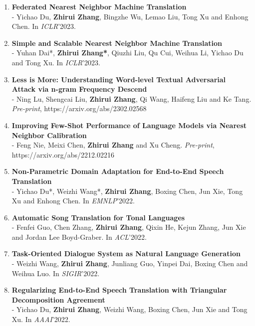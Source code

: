 \documentclass{resume}
\begin{document}
\begin{enumerate}

\item \normalsize \textbf{Federated Nearest Neighbor Machine Translation}\\
\small - Yichao Du, \textbf{Zhirui Zhang}, Bingzhe Wu, Lemao Liu, Tong Xu and Enhong Chen. In \textit{ICLR}'2023.

\item \normalsize \textbf{Simple and Scalable Nearest Neighbor Machine Translation}\\
\small - Yuhan Dai*, \textbf{Zhirui Zhang*}, Qiuzhi Liu, Qu Cui, Weihua Li, Yichao Du and Tong Xu. In \textit{ICLR}'2023.

\item \normalsize \textbf{Less is More: Understanding Word-level Textual Adversarial Attack via n-gram Frequency Descend}\\
\small - Ning Lu, Shengcai Liu, \textbf{Zhirui Zhang}, Qi Wang, Haifeng Liu and Ke Tang. \textit{Pre-print}, https://arxiv.org/abs/2302.02568

\item \normalsize \textbf{Improving Few-Shot Performance of Language Models via Nearest Neighbor Calibration}\\
\small - Feng Nie, Meixi Chen, \textbf{Zhirui Zhang} and Xu Cheng. \textit{Pre-print}, https://arxiv.org/abs/2212.02216


\item \normalsize \textbf{Non-Parametric Domain Adaptation for End-to-End Speech Translation}\\
\small - Yichao Du*, Weizhi Wang*, \textbf{Zhirui Zhang}, Boxing Chen, Jun Xie, Tong Xu and Enhong Chen. In \textit{EMNLP}'2022.

\item \normalsize \textbf{Automatic Song Translation for Tonal Languages}\\
\small - Fenfei Guo, Chen Zhang, \textbf{Zhirui Zhang}, Qixin He, Kejun Zhang, Jun Xie and Jordan Lee Boyd-Graber. In \textit{ACL}'2022.

\item \normalsize \textbf{Task-Oriented
Dialogue System as Natural Language Generation}\\
\small - Weizhi Wang, \textbf{Zhirui Zhang}, Junliang Guo, Yinpei Dai, Boxing Chen and Weihua Luo. In \textit{SIGIR}'2022.

\item \normalsize \textbf{Regularizing End-to-End Speech Translation with Triangular Decomposition Agreement}\\
\small - Yichao Du, \textbf{Zhirui Zhang}, Weizhi Wang, Boxing Chen, Jun Xie and Tong Xu. In \textit{AAAI}'2022.


\end{enumerate}
\end{document}
